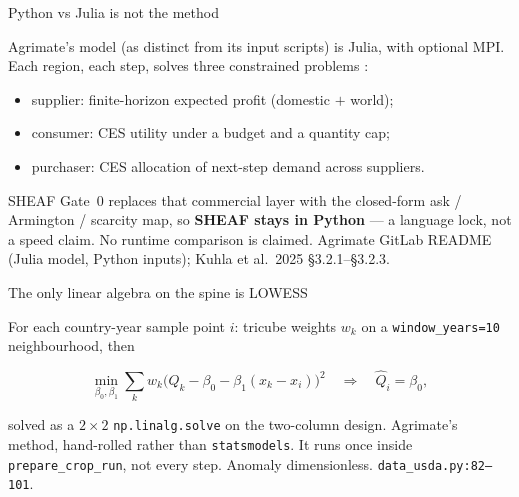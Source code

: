 \begin{frame}{Python vs Julia is not the method}

Agrimate's model (as distinct from its input scripts) is Julia, with
optional MPI. Each region, each step, solves three constrained problems
\citep{kuhla2025}:

\begin{itemize}
\item supplier: finite-horizon expected profit (domestic $+$ world);
\item consumer: CES utility under a budget and a quantity cap;
\item purchaser: CES allocation of next-step demand across suppliers.
\end{itemize}

SHEAF Gate~0 replaces that commercial layer with the closed-form ask /
Armington / scarcity map, so \textbf{SHEAF stays in Python} --- a language
lock, not a speed claim.
{No runtime comparison is claimed.}
{Agrimate GitLab README (Julia model, Python inputs);
Kuhla et al.\ 2025 \S3.2.1--\S3.2.3.}
\end{frame}

\begin{frame}{The only linear algebra on the spine is LOWESS}

For each country-year sample point $i$: tricube weights $w_k$ on a
\texttt{window\_years=10} neighbourhood, then

\[
\min_{\beta_0,\beta_1}
\sum_k w_k\bigl(Q_k-\beta_0-\beta_1(x_k-x_i)\bigr)^2
\quad\Rightarrow\quad
\hat Q_i=\beta_0,
\]

solved as a $2\times 2$ \texttt{np.linalg.solve} on the two-column design.
Agrimate's method, hand-rolled rather than \texttt{statsmodels}. It runs
once inside \texttt{prepare\_crop\_run}, not every step.
{Anomaly dimensionless.}
{\texttt{data\_usda.py:82--101}.}
\end{frame}

